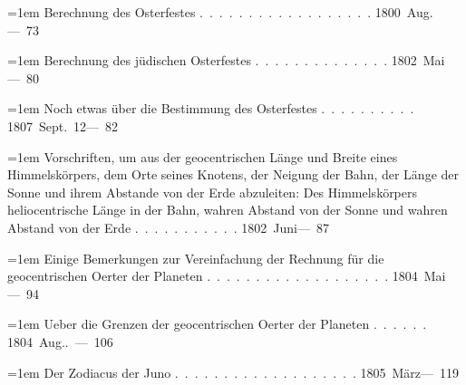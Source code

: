 \noindent\hangindent=1em Berechnung des Osterfestes \mbox{.\ .\ .\ .\ .\ .\ .\ .\ .\ .\ .\ .\ .\ .\ .\ .\ .\ .} \hfill\mbox{1800 Aug.}\quad\mbox{--- 73}\par\smallskip
\noindent\hangindent=1em Berechnung des jüdischen Osterfestes \mbox{.\ .\ .\ .\ .\ .\ .\ .\ .\ .\ .\ .\ .\ .} \hfill\mbox{1802 Mai}\quad\mbox{--- 80}\par\smallskip
\noindent\hangindent=1em Noch etwas über die Bestimmung des Osterfestes \mbox{.\ .\ .\ .\ .\ .\ .\ .\ .\ .} \hfill\mbox{1807 Sept. 12}\quad\mbox{--- 82}\par\smallskip
\noindent\hangindent=1em Vorschriften, um aus der geocentrischen Länge und Breite eines Himmelskörpers, dem Orte seines Knotens, der Neigung der Bahn, der Länge der Sonne und ihrem Abstande von der Erde abzuleiten: Des Himmelskörpers heliocentrische Länge in der Bahn, wahren Abstand von der Sonne und wahren Abstand von der Erde \mbox{.\ .\ .\ .\ .\ .\ .\ .\ .\ .\ .} \hfill\mbox{1802 Juni}\quad\mbox{--- 87}\par\smallskip
\noindent\hangindent=1em Einige Bemerkungen zur Vereinfachung der Rechnung für die geocentrischen Oerter der Planeten \mbox{.\ .\ .\ .\ .\ .\ .\ .\ .\ .\ .\ .\ .\ .\ .\ .\ .\ .\ .} \hfill\mbox{1804 Mai}\quad\mbox{--- 94}\par\smallskip
\noindent\hangindent=1em Ueber die Grenzen der geocentrischen Oerter der Planeten \mbox{.\ .\ .\ .\ .\ .} \hfill\mbox{1804 Aug.}\quad\mbox{. --- 106}\par\smallskip
\noindent\hangindent=1em Der Zodiacus der Juno \mbox{.\ .\ .\ .\ .\ .\ .\ .\ .\ .\ .\ .\ .\ .\ .\ .\ .\ .\ .} \hfill\mbox{1805 März}\quad\mbox{--- 119}\par\smallskip
\endgroup
